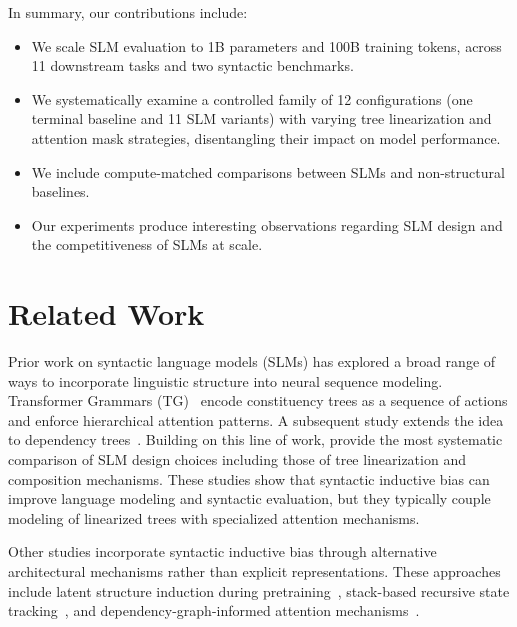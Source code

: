 \documentclass[11pt]{article}
\begin{document}
In summary, our contributions include:
\begin{itemize}
    \item We scale SLM evaluation to 1B parameters and 100B training tokens, across 11 downstream tasks and two syntactic benchmarks. %
    \item We systematically examine a controlled family of 12 configurations (one terminal baseline and 11 SLM variants) with varying tree linearization and attention mask strategies, disentangling their impact on model performance.
    \item We include compute-matched comparisons between SLMs and non-structural baselines.
    \item Our experiments produce interesting observations regarding SLM design and the competitiveness of SLMs at scale.
\end{itemize}

\section{Related Work}


Prior work on syntactic language models (SLMs) has explored a broad range of ways to incorporate linguistic structure into neural sequence modeling. Transformer Grammars (TG)~\cite{sartran-etal-2022-transformer} encode constituency trees as a sequence of actions and enforce hierarchical attention patterns. A subsequent study extends the idea to dependency trees~\cite{zhao-etal-2024-dependency}. Building on this line of work, \citet{zhao-etal-2025-systematic} provide the most systematic comparison of SLM design choices including those of tree linearization and composition mechanisms. These studies show that syntactic inductive bias can improve language modeling and syntactic evaluation, but they typically couple modeling of linearized trees with specialized attention mechanisms.

Other studies incorporate syntactic inductive bias through alternative architectural mechanisms rather than explicit representations. These approaches include latent structure induction during pretraining~\cite{hu-etal-2024-generative}, stack-based recursive state tracking~\cite{murty-etal-2023-pushdown}, and dependency-graph-informed attention mechanisms~\cite{huang2026GiLT}.
\end{document}
